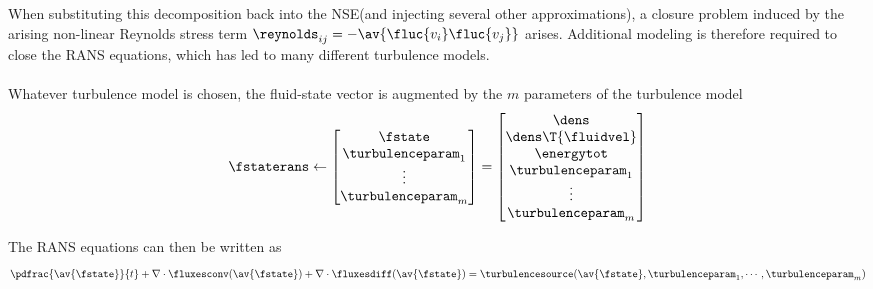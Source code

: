 \documentclass[../main.tex]{subfiles}
\begin{document}
When substituting this decomposition back into the \ac{NSE}(and injecting several other approximations), a closure problem induced by the arising non-linear Reynolds stress term ${\reynolds}_{ij}=-\av{\fluc{v_i}\fluc{v_j}}$ arises. Additional modeling is therefore required to close the \ac{RANS} equations, which has led to many different turbulence models.\\
\\
Whatever turbulence model is chosen, the fluid-state vector is augmented by the $m$ parameters of the turbulence model
\begin{align}
\fstaterans \leftarrow
\begin{bmatrix}
\fstate            \\
\turbulenceparam_1 \\
\vdots             \\
\turbulenceparam_m
\end{bmatrix} =
	\begin{bmatrix}
	\dens              \\
	\dens\T{\fluidvel} \\
	\energytot         \\
	\turbulenceparam_1 \\
	\vdots             \\
	\turbulenceparam_m
	\end{bmatrix}
\end{align}

The \ac{RANS} equations can then be written as
\begin{align}\label{eq:rans_eqautions}
\pdfrac{\av{\fstate}}{t} + \nabla\cdot\fluxesconv(\av{\fstate}) +  \nabla\cdot\fluxesdiff(\av{\fstate}) =
\turbulencesource(\av{\fstate},\turbulenceparam_1,\cdots,\turbulenceparam_m)
\end{align}
\end{document}
